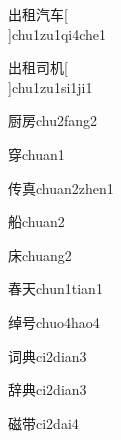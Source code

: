 \begin{verbete}[5;10;7;4]{出租汽车}[\\]{chu1zu1qi4che1}
\end{verbete}

\begin{verbete}[5;10;5;6]{出租司机}[\\]{chu1zu1si1ji1}
\end{verbete}

\begin{verbete}[12;8]{厨房}{chu2fang2}
\end{verbete}

\begin{verbete}[9]{穿}{chuan1}
\end{verbete}

\begin{verbete}[6;10]{传真}{chuan2zhen1}
\end{verbete}

\begin{verbete}[11]{船}{chuan2}
\end{verbete}

\begin{verbete}[7]{床}{chuang2}
\end{verbete}

\begin{verbete}[9;4]{春天}{chun1tian1}
\end{verbete}

\begin{verbete}[11;5]{绰号}{chuo4hao4}
\end{verbete}

\begin{verbete}[7;8]{词典}{ci2dian3}
\end{verbete}

\begin{verbete}[13;8]{辞典}{ci2dian3}
\end{verbete}

\begin{verbete}[14;9]{磁带}{ci2dai4}
\end{verbete}

